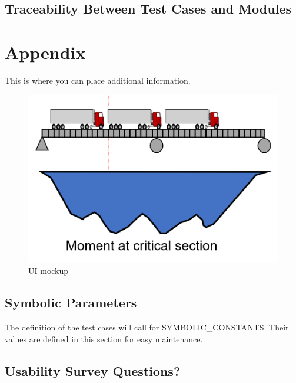 \documentclass[12pt, titlepage]{article}
\begin{document}
\subsection{Traceability Between Test Cases and Modules}

				




\newpage

\section{Appendix}

This is where you can place additional information.

\begin{figure}[h]
  \includegraphics[width=\linewidth]{UI.png}
  \caption{UI mockup}
  \label {fig:ui-mockup}
\end{figure}

\subsection{Symbolic Parameters}

The definition of the test cases will call for SYMBOLIC\_CONSTANTS.
Their values are defined in this section for easy maintenance.

\subsection{Usability Survey Questions?}
\end{document}
